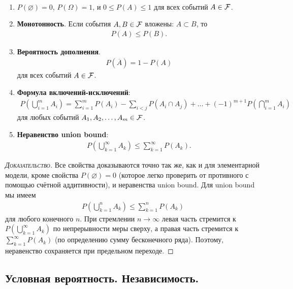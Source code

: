 \documentclass[../main.tex]{subfiles}
\begin{document}
\begin{prop}\
 \begin{enumerate}
  \item $ P(\varnothing) = 0 $, $ P(\Omega) = 1 $, и $ 0 \leqslant P(A) \leqslant 1 $ для всех событий $ A \in \mathcal F $.
  \item \textbf{Монотонность}. Если события $ A,B\in\mathcal F $ вложены: $ A \subset B $, то
   \begin{align*}
    P(A) \leqslant P(B).
   \end{align*}
  \item \textbf{Вероятность дополнения}.
   \begin{align*}
    P(\overline A) = 1 - P(A)
   \end{align*}
   для всех событий $ A \in \mathcal F $.
  \item \textbf{Формула включений-исключений}:
   \begin{align}
    \label{eq:inclusion_exclusion}
    P \left( \bigcup_{i=1}^{m} A_i \right) = \sum_{i=1}^{m}P(A_i) - \sum_{i < j}P(A_i \cap A_j) + \ldots + (-1)^{m+1}P \left( \bigcap_{i=1}^{m}A_i \right)
   \end{align} для любых событий $ A_1, A_2, \ldots, A_m \in \mathcal F $.
  \item \textbf{Неравенство union bound}:
   \begin{align*}
    P \left( \bigcup_{k=1}^{\infty}A_k \right) \leqslant \sum_{k=1}^{\infty} P(A_k).
   \end{align*}
 \end{enumerate}
\end{prop}
\begin{proof}[\normalfont\textsc{Доказательство}]
 Все свойства доказываются точно так же, как и для элементарной модели, кроме свойства $ P(\varnothing) = 0 $ (которое легко проверить от противного с помощью счётной аддитивности), и неравенства union bound. Для union bound мы имеем
 \begin{align*}
  P \left( \bigcup_{k=1}^{n}A_k \right) \leqslant \sum_{k=1}^{n}P(A_k)
 \end{align*} для любого конечного $ n $. При стремлении $ n \to \infty $  левая часть стремится к $ P \left( \bigcup_{k=1}^{\infty}A_k \right) $ по непрерывности меры сверху, а правая часть стремится к $ \sum_{k=1}^{\infty} P(A_k)$ (по определению сумму бесконечного ряда). Поэтому, неравенство сохраняется при предельном переходе.
\end{proof}

\subsection{Условная вероятность. Независимость.}
\end{document}
